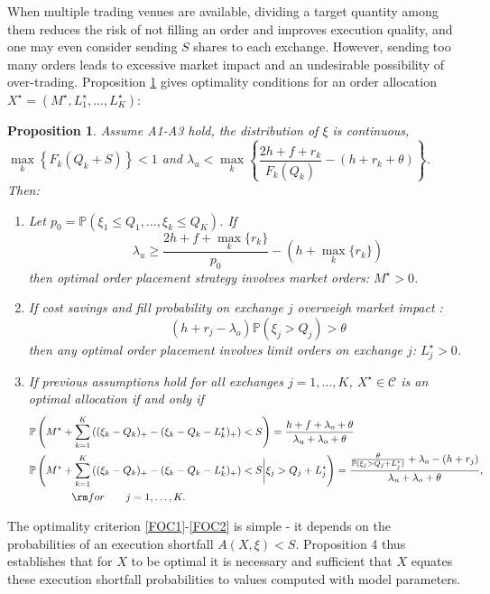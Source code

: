 \documentclass[opre,nonblindrev]{informs3}
\newtheorem{myprop}{Proposition}
\begin{document}
When multiple trading venues are available, dividing a target quantity among them reduces the risk of not filling an order and improves execution quality, and one may even consider sending $S$ shares to each exchange. However, sending too many orders leads to excessive market impact and an undesirable possibility of over-trading. Proposition \ref{prop.foc} gives optimality conditions for an order allocation $X^{\star}=(M^{\star},L^{\star}_1,\dots,L^{\star}_K)$:
\begin{myprop}\label{prop.foc}
Assume A1-A3 hold, the distribution of $\xi$ is continuous, $\underset{k}{\max}\left\{F_k(Q_k+S)\right\}<1$ and $\lambda_u<\underset{k}{\max}\left\{\dfrac{2h+f+r_k}{F_k(Q_k)}-(h+r_k+\theta)\right\}$. Then:
\vskip 6pt
\begin{enumerate}
\item Let $p_0=\mathbb{P}\left(\xi_1\leq Q_1,...,\xi_k\leq Q_K\right)$. If 
$$\qquad \lambda_u\geq\frac{2h+f+\underset{k}{\max}\{r_k\}}{p_0}-(h+\underset{k}{\max}\{r_k\})$$ then optimal order placement strategy involves market orders: $M^\star>0$.
\item If cost savings and fill probability on exchange $j$ overweigh market impact :
$$\qquad (h+r_j-\lambda_o)\mathbb{P}\left(\xi_j>Q_j\right) > \theta$$
then any optimal order placement   involves limit orders on exchange $j$: $L_j^\star>0$.
\item If previous   assumptions hold for all exchanges $j=1,\dots,K$,  $X^\star\in\mathcal{C}$ is an optimal allocation if and only if
\begin{align}
&\mathbb{P}\left(M^{\star}+\sum\limits_{k=1}^K\left((\xi_k-Q_k)_+-(\xi_k-Q_k-L^{\star}_k)_+\right)<S\right)=\frac{h+f+\lambda_o+\theta}{\lambda_u+\lambda_o+\theta} \label{FOC1}\\
&\mathbb{P}\left(M^{\star}+\sum\limits_{k=1}^K\left((\xi_k-Q_k)_+-(\xi_k-Q_k-L^{\star}_k)_+\right)<S \bigg| \xi_j>Q_j+L^{\star}_j\right)  %
= \frac{ \frac{\theta}{\mathbb{P}(\xi_j>Q_j+L^*_j)} +\lambda_o-(h+r_j)}{\lambda_u+\lambda_o+\theta}, \nonumber\\
&\qquad\qquad  {\rm for}\qquad j=1,\dots, K. \label{FOC2}
\end{align}

\end{enumerate}

\end{myprop}

The optimality criterion \eqref{FOC1}-\eqref{FOC2} is simple - it depends on the probabilities of an execution shortfall  $A(X,\xi)<S$. Proposition 4 thus establishes that for $X$ to be optimal it is necessary and sufficient that $X$ equates these execution shortfall probabilities to  values computed with model parameters.
\end{document}

